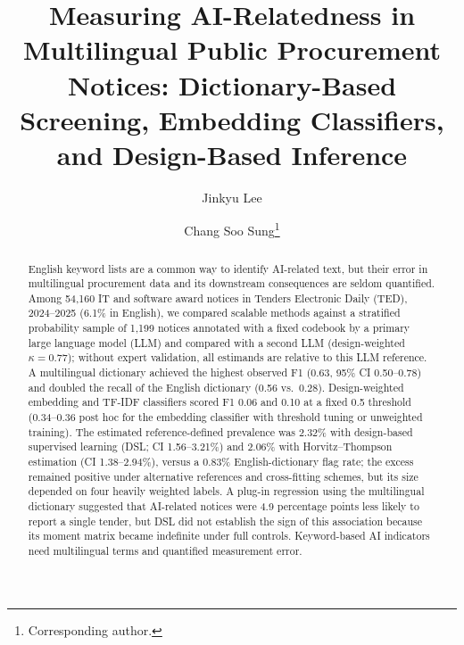 \documentclass[runningheads]{llncs}
\begin{document}
\title{Measuring AI-Relatedness in Multilingual Public Procurement Notices: Dictionary-Based Screening, Embedding Classifiers, and Design-Based Inference}
\author{Jinkyu Lee \and Chang Soo Sung\thanks{Corresponding author.}}
\maketitle

\begin{abstract}
English keyword lists are a common way to identify AI-related text, but their error in multilingual procurement data and its downstream consequences are seldom quantified. Among 54,160 IT and software award notices in Tenders Electronic Daily (TED), 2024--2025 (6.1\% in English), we compared scalable methods against a stratified probability sample of 1,199 notices annotated with a fixed codebook by a primary large language model (LLM) and compared with a second LLM (design-weighted $\kappa=0.77$); without expert validation, all estimands are relative to this LLM reference. A multilingual dictionary achieved the highest observed F1 (0.63, 95\% CI 0.50--0.78) and doubled the recall of the English dictionary (0.56 vs.\ 0.28). Design-weighted embedding and TF-IDF classifiers scored F1 0.06 and 0.10 at a fixed 0.5 threshold (0.34--0.36 post hoc for the embedding classifier with threshold tuning or unweighted training). The estimated reference-defined prevalence was 2.32\% with design-based supervised learning (DSL; CI 1.56--3.21\%) and 2.06\% with Horvitz--Thompson estimation (CI 1.38--2.94\%), versus a 0.83\% English-dictionary flag rate; the excess remained positive under alternative references and cross-fitting schemes, but its size depended on four heavily weighted labels. A plug-in regression using the multilingual dictionary suggested that AI-related notices were 4.9 percentage points less likely to report a single tender, but DSL did not establish the sign of this association because its moment matrix became indefinite under full controls. Keyword-based AI indicators need multilingual terms and quantified measurement error.
\end{abstract}
\end{document}
